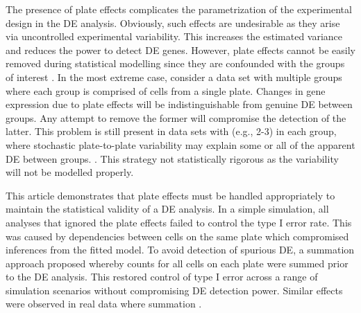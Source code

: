 \documentclass[oupdraft]{bio}
\begin{document}
The presence of plate effects complicates the parametrization of the experimental design in the DE analysis.
Obviously, such effects are undesirable as they arise via uncontrolled experimental variability.
This increases the estimated variance and reduces the power to detect DE genes.
However, plate effects cannot be easily removed during statistical modelling since they are confounded with the groups of interest \citep{hicks2015widespread,tung2016batch}.
In the most extreme case, consider a data set with multiple groups where each group is comprised of cells from a single plate.
Changes in gene expression due to plate effects will be indistinguishable from genuine DE between groups.
Any attempt to remove the former will compromise the detection of the latter.
This problem is still present in data sets with  (e.g., 2-3) in each group, 
    where stochastic plate-to-plate variability may explain some or all of the apparent DE between groups.
.
This strategy  not statistically rigorous as the variability  will not be modelled properly.


This article demonstrates that plate effects must be handled appropriately to maintain the statistical validity of a DE analysis.
In a simple simulation, all analyses that ignored the plate effects failed to control the type I error rate.
This was caused by dependencies between cells on the same plate which compromised inferences from the fitted model.
To avoid detection of spurious DE, a summation approach  proposed whereby counts for all cells on each plate were summed prior to the DE analysis.
This restored control of type I error across a range of simulation scenarios without compromising DE detection power.
Similar effects were observed in real data where summation .
\end{document}
